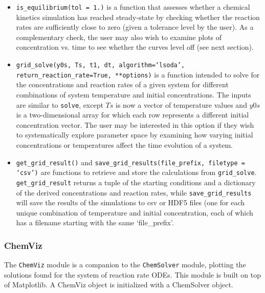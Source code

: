 \documentclass[12pt]{article}
\begin{document}
\begin{itemize}
\item \texttt{is\_equilibrium(tol = 1.)} is a function that assesses whether a chemical kinetics simulation has reached steady-state by checking whether the reaction rates are sufficiently close to zero (given a tolerance level by the user). As a complementary check, the user may also wish to examine plots of concentration vs. time to see whether the curves level off (see next section). 
\item \texttt{grid\_solve(y0s, Ts, t1, dt, algorithm=`lsoda', return\_reaction\_rate=True, **options)} is a function intended to solve for the concentrations and reaction rates of a given system for different combinations of system temperature and initial concentrations. The inputs are similar to \texttt{solve}, except $Ts$ is now a vector of temperature values and $y0s$ is a two-dimensional array for which each row represents a different initial concentration vector. The user may be interested in this option if they wish to systematically explore parameter space by examining how varying initial concentrations or temperatures affect the time evolution of a system. 
\item \texttt{get\_grid\_result()} and \texttt{save\_grid\_results(file\_prefix, filetype = `csv')} are functions to retrieve and store the calculations from \texttt{grid\_solve}. \texttt{get\_grid\_result} returns a tuple of the starting conditions and a dictionary of the derived concentrations and reaction rates, while \texttt{save\_grid\_results} will save the results of the simulations to csv or HDF5 files (one for each unique combination of temperature and initial concentration, each of which has a filename starting with the same `file\_prefix'. 
\end{itemize}

\subsubsection{ChemViz}
The \texttt{ChemViz} module is a companion to the \texttt{ChemSolver} module, plotting the solutions found for the system of reaction rate ODEs. This module is built on top of Matplotlib. A ChemViz object is initialized with a ChemSolver object. 
\end{document}
